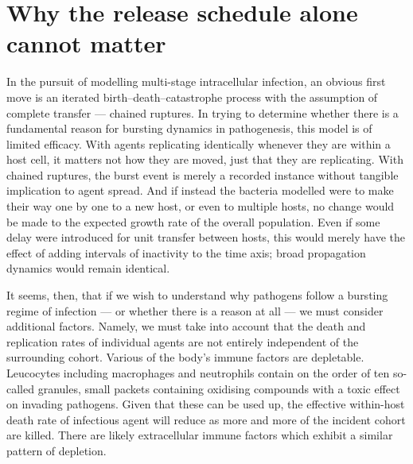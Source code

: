 %

\section{Why the release schedule alone cannot matter}
\label{path:sec:schedule}

In the pursuit of modelling multi-stage intracellular infection, an obvious
first move is an iterated birth--death--catastrophe process with the
assumption of complete transfer --- chained ruptures. In trying to determine
whether there is a fundamental reason for bursting dynamics in pathogenesis,
this model is of limited efficacy. With agents replicating identically
whenever they are within a host cell, it matters not how they are moved,
just that they are replicating. With chained ruptures, the burst event is
merely a recorded instance without tangible implication to agent spread. And
if instead the bacteria modelled were to make their way one by one to a new
host, or even to multiple hosts, no change would be made to the expected
growth rate of the overall population. Even if some delay were introduced
for unit transfer between hosts, this would merely have the effect of adding
intervals of inactivity to the time axis; broad propagation dynamics would
remain identical.

It seems, then, that if we wish to understand why pathogens follow a
bursting regime of infection --- or whether there is a reason at all --- we
must consider additional factors. Namely, we must take into account that the
death and replication rates of individual agents are not entirely
independent of the surrounding cohort. Various of the body's immune factors
are depletable. Leucocytes including macrophages and neutrophils contain on
the order of ten so-called granules, small packets containing oxidising
compounds with a toxic effect on invading pathogens. Given that these can be
used up, the effective within-host death rate of infectious agent will
reduce as more and more of the incident cohort are killed. There are likely
extracellular immune factors which exhibit a similar pattern of depletion.

